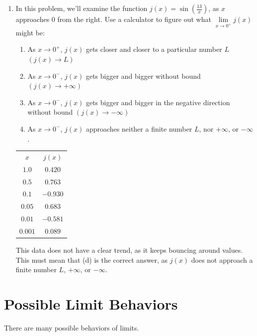 \documentclass{article}
\begin{document}
\begin{enumerate}
\item In this problem, we'll examine the function $j(x) = \sin(\frac{13}{x})$, as $x$ approaches $0$ from
the right. Use a calculator to figure out what $\underset{x \rightarrow 0^{+}}{\lim} j(x)$ might be:
    \begin{enumerate}
        \item As $x \rightarrow 0^{+}$, $j(x)$ gets closer and closer to a particular number $L$
            $\left(j(x) \rightarrow L\right)$
        \item As $x \rightarrow 0^{-}$, $j(x)$ gets bigger and bigger without bound
            $\left(j(x) \rightarrow +\infty\right)$
        \item As $x \rightarrow 0^{-}$, $j(x)$ gets bigger and bigger in the negative direction without bound
            $\left(j(x) \rightarrow -\infty\right)$
        \item As $x \rightarrow 0^{-}$, $j(x)$ approaches neither a finite number $L$, nor $+\infty$, or $-\infty$.
    \end{enumerate}
    \begin{center}
        \begin{tabular} { c|c }
            $x$ & $j(x)$\\
            \cline{1-2}
            $1.0$ & $0.420$\\
            $0.5$ & $0.763$\\
            $0.1$ & $-0.930$\\
            $0.05$ & $0.683$\\
            $0.01$ & $-0.581$\\
            $0.001$ & $0.089$
        \end{tabular}
        \end{center}
This data does not have a clear trend, as it keeps bouncing around values. This must mean that (d) is the
correct answer, as $j(x)$ does not approach a finite number $L$, $+\infty$, or $-\infty$.
\end{enumerate}

\pagebreak
\section{Possible Limit Behaviors}
There are many possible behaviors of limits.
\end{document}
